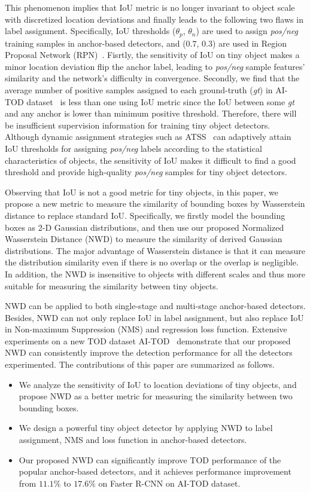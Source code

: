 \documentclass{article}
\begin{document}
This phenomenon implies that IoU metric is no longer invariant to object scale with discretized location deviations and finally leads to the following two flaws in label assignment. Specifically, IoU thresholds ($\theta_p$, $\theta_n$) are used to assign \textit{pos/neg} training samples in anchor-based detectors, and ($0.7$, $0.3$) are used in Region Proposal Network (RPN)~\cite{Fast-R-CNN_2015_ICCV}. Fisrtly, the sensitivity of IoU on tiny object makes a minor location deviation flip the anchor label, leading to \textit{pos/neg} sample features' similarity and the network's difficulty in convergence. Secondly, we find that the average number of positive samples assigned to each ground-truth (\textit{gt}) in AI-TOD dataset~\cite{AI-TOD_2020_ICPR} is less than one using IoU metric since the IoU between some \textit{gt} and any anchor is lower than minimum positive threshold. Therefore, there will be insufficient supervision information for training tiny object detectors. Although dynamic assignment strategies such as ATSS~\cite{atss_2020_cvpr} can adaptively attain IoU thresholds for assigning \textit{pos/neg} labels according to the statistical characteristics of objects, 
the sensitivity of IoU makes it difficult to find a good threshold and provide high-quality \textit{pos/neg} samples for tiny object detectors. 

Observing that IoU is not a good metric for tiny objects, in this paper, we propose a new metric to measure the similarity of bounding boxes by Wasserstein distance to replace standard IoU. Specifically, we firstly model the bounding boxes as 2-D Gaussian distributions, and then use our proposed Normalized Wasserstein Distance (NWD) to measure the similarity of derived Gaussian distributions. The major advantage of Wasserstein distance is that it can measure the distribution similarity even if there is no overlap or the overlap is negligible. In addition, the NWD is insensitive to objects with different scales and thus more suitable for measuring the similarity between tiny objects.

NWD can be applied to both single-stage and multi-stage anchor-based detectors. Besides, NWD can not only replace IoU in label assignment, but also replace IoU in Non-maximum Suppression (NMS) and regression loss function. Extensive experiments on a new TOD dataset AI-TOD~\cite{AI-TOD_2020_ICPR} demonstrate that our proposed NWD can consistently improve the detection performance for all the detectors experimented. The contributions of this paper are summarized as follows.
\begin{itemize}[leftmargin=*]
    \item We analyze the sensitivity of IoU to location deviations of tiny objects, and propose NWD as a better metric for measuring the similarity between two bounding boxes.
    \item We design a powerful tiny object detector by applying NWD to label assignment, NMS and loss function in anchor-based detectors.
    \item Our proposed NWD can significantly improve TOD performance of the popular anchor-based detectors, and it achieves performance improvement from $11.1\%$ to $17.6\%$ on Faster R-CNN on AI-TOD dataset.
\end{itemize}
\end{document}
